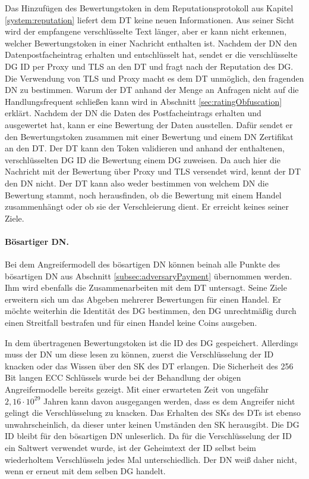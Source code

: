 \documentclass[
	fontsize=11pt,
	headings=small,
	parskip=half,           %
	bibliography=totoc,
	numbers=noenddot,       %
	open=any,               %
]{scrreprt}
\begin{document}
Das Hinzufügen des Bewertungstoken in dem Reputationsprotokoll aus Kapitel \ref{system:reputation} liefert dem DT keine neuen Informationen. Aus seiner Sicht wird der empfangene verschlüsselte Text länger, aber er kann nicht erkennen, welcher Bewertungstoken in einer Nachricht enthalten ist. Nachdem der DN den Datenpostfacheintrag erhalten und entschlüsselt hat, sendet er die verschlüsselte DG ID per Proxy und TLS an den DT und fragt nach der Reputation des DG. Die Verwendung von TLS und Proxy macht es dem DT unmöglich, den fragenden DN zu bestimmen. Warum der DT anhand der Menge an Anfragen nicht auf die Handlungsfrequent schließen kann wird in Abschnitt \ref{sec:ratingObfuscation} erklärt. Nachdem der DN die Daten des Postfacheintrags erhalten und ausgewertet hat, kann er eine Bewertung der Daten ausstellen. Dafür sendet er den Bewertungstoken zusammen mit einer Bewertung und einem DN Zertifikat an den DT. Der DT kann den Token validieren und anhand der enthaltenen, verschlüsselten DG ID die Bewertung einem DG zuweisen. Da auch hier die Nachricht mit der Bewertung über Proxy und TLS versendet wird, kennt der DT den DN nicht. Der DT kann also weder bestimmen von welchem DN die Bewertung stammt, noch herausfinden, ob die Bewertung mit einem Handel zusammenhängt oder ob sie der Verschleierung dient. Er erreicht keines seiner Ziele. 

\paragraph{Bösartiger DN.}
Bei dem Angreifermodell des bösartigen DN können beinah alle Punkte des bösartigen DN aus Abschnitt \ref{subsec:adversaryPayment} übernommen werden. Ihm wird ebenfalls die Zusammenarbeiten mit dem DT untersagt. Seine Ziele erweitern sich um das Abgeben mehrerer Bewertungen für einen Handel. Er möchte weiterhin die Identität des DG bestimmen, den DG unrechtmäßig durch einen Streitfall bestrafen und für einen Handel keine Coins ausgeben.

In dem übertragenen Bewertungstoken ist die ID des DG gespeichert. Allerdings muss der DN um diese lesen zu können, zuerst die Verschlüsselung der ID knacken oder das Wissen über den SK des DT erlangen. Die Sicherheit des 256 Bit langen ECC Schlüssels wurde bei der Behandlung der obigen Angreifermodelle bereits gezeigt. Mit einer erwarteten Zeit von ungefähr $2,16\cdot10^{29}$ Jahren kann davon ausgegangen werden, dass es dem Angreifer nicht gelingt die Verschlüsselung zu knacken. Das Erhalten des SKs des DTs ist ebenso unwahrscheinlich, da dieser unter keinen Umständen den SK herausgibt. Die DG ID bleibt für den bösartigen DN unleserlich. Da für die Verschlüsselung der ID ein Saltwert verwendet wurde, ist der Geheimtext der ID selbst beim wiederholtem Verschlüsseln jedes Mal unterschiedlich. Der DN weiß daher nicht, wenn er erneut mit dem selben DG handelt.
\end{document}
